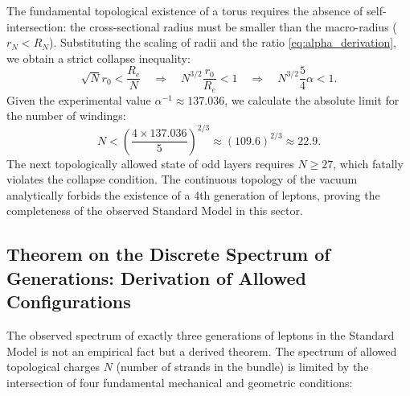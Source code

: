 \documentclass[11pt,a4paper]{article}
\begin{document}
The fundamental topological existence of a torus requires the absence of self-intersection: the cross-sectional radius must be smaller than the macro-radius ($r_N < R_N$). Substituting the scaling of radii and the ratio \eqref{eq:alpha_derivation}, we obtain a strict collapse inequality:
\begin{equation}
\sqrt{N} r_0 < \frac{R_e}{N} \quad \Longrightarrow \quad N^{3/2} \frac{r_0}{R_e} < 1 \quad \Longrightarrow \quad N^{3/2} \frac{5}{4}\alpha < 1.
\end{equation}
Given the experimental value $\alpha^{-1} \approx 137.036$, we calculate the absolute limit for the number of windings:
\begin{equation}
N < \left( \frac{4 \times 137.036}{5} \right)^{2/3} \approx (109.6)^{2/3} \approx 22.9.
\end{equation}
The next topologically allowed state of odd layers requires $N \ge 27$, which fatally violates the collapse condition. The continuous topology of the vacuum analytically forbids the existence of a 4th generation of leptons, proving the completeness of the observed Standard Model in this sector.

\subsection{Theorem on the Discrete Spectrum of Generations: Derivation of Allowed Configurations}
The observed spectrum of exactly three generations of leptons in the Standard Model is not an empirical fact but a derived theorem. The spectrum of allowed topological charges $N$ (number of strands in the bundle) is limited by the intersection of four fundamental mechanical and geometric conditions:
\end{document}
